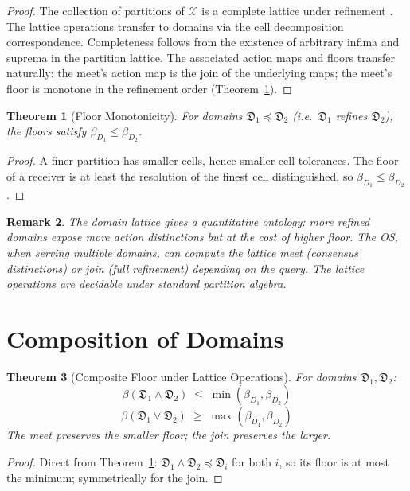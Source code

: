 \documentclass[twocolumn,11pt,a4paper]{article}
\newtheorem{theorem}{Theorem}[section]
\newtheorem{remark}[theorem]{Remark}
\newcommand{\Cands}{\mathcal{X}}
\newcommand{\Domain}{\mathfrak{D}}
\begin{document}
\begin{proof}
The collection of partitions of $\Cands$ is a complete lattice under refinement \citep{birkhoff1948lattice,davey2002introduction}. The lattice operations transfer to domains via the cell decomposition correspondence. Completeness follows from the existence of arbitrary infima and suprema in the partition lattice. The associated action maps and floors transfer naturally: the meet's action map is the join of the underlying maps; the meet's floor is monotone in the refinement order (Theorem~\ref{thm:floor-monotone}).
\end{proof}

\begin{theorem}[Floor Monotonicity]
\label{thm:floor-monotone}
For domains $\Domain_1 \preceq \Domain_2$ (i.e.\ $\Domain_1$ refines $\Domain_2$), the floors satisfy $\beta_{D_1} \leq \beta_{D_2}$.
\end{theorem}

\begin{proof}
A finer partition has smaller cells, hence smaller cell tolerances. The floor of a receiver is at least the resolution of the finest cell distinguished, so $\beta_{D_1} \leq \beta_{D_2}$.
\end{proof}

\begin{remark}
\label{rem:lattice-meaning}
The domain lattice gives a quantitative ontology: more refined domains expose more action distinctions but at the cost of higher floor. The OS, when serving multiple domains, can compute the lattice meet (consensus distinctions) or join (full refinement) depending on the query. The lattice operations are decidable under standard partition algebra.
\end{remark}

\section{Composition of Domains}

\begin{theorem}[Composite Floor under Lattice Operations]
\label{thm:composite-floor-lattice}
For domains $\Domain_1, \Domain_2$:
\[
\beta(\Domain_1 \wedge \Domain_2) \;\leq\; \min(\beta_{D_1}, \beta_{D_2})
\]
\[
\beta(\Domain_1 \vee \Domain_2) \;\geq\; \max(\beta_{D_1}, \beta_{D_2})
\]
The meet preserves the smaller floor; the join preserves the larger.
\end{theorem}

\begin{proof}
Direct from Theorem~\ref{thm:floor-monotone}: $\Domain_1 \wedge \Domain_2 \preceq \Domain_i$ for both $i$, so its floor is at most the minimum; symmetrically for the join.
\end{proof}
\end{document}

